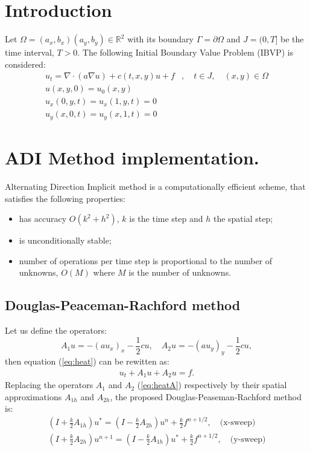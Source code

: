 \documentclass[12pt]{article}
\begin{document}
\section{Introduction}
Let $\Omega=(a_x, b_x)(a_y, b_y)\in \mathbb{R}^2$ with its boundary $\Gamma=\partial \Omega$ and
$J=(0,T]$ be the time interval, $T>0$. The following Initial Boundary Value Problem (IBVP) is considered:
\begin{eqnarray}
u_t= \nabla\cdot(a\nabla u) + c(t, x, y) u + f&, \quad t\in J, \quad (x,y)\in \Omega \label{eq:heat}\\
u(x,y,0) = u_0(x,y)&\\
u_x(0,y,t)=u_x(1,y,t)=0&\\
u_y(x,0,t)=u_y(x,1,t)=0& 
\end{eqnarray}




\section{ADI Method implementation.}
 Alternating Direction Implicit method is a computationally efficient scheme,
 that satisfies the following properties:
  \begin{itemize}
    \item has accuracy $O(k^2 + h^2)$, $k$ is the time step and $h$ the spatial
    step;
    \item is unconditionally stable;
    \item number of operations per time step is proportional to the number of unknowns, $O(M)$
     where $ M$ is the number of unknowns.       
  \end{itemize}

\subsection{Douglas-Peaceman-Rachford method}
Let us define the operators:
$$A_1u = -(au_x)_x - \frac{1}{2}cu, \quad A_2u = -(au_y)_y - \frac{1}{2}cu,$$
then equation (\ref{eq:heat}) can be rewitten as:
\begin{eqnarray} 
u_t + A_1u + A_2u = f. \label{eq:heatA}
\end{eqnarray}
Replacing the operators $A_1$ and $A_2$ (\ref{eq:heatA}) respectively by their spatial approximations
$A_{1h}$ and $A_{2h}$, the proposed Douglas-Peaseman-Rachford method is:
\begin{eqnarray}
(I+\frac{k}{2}A_{1h})u^* = (I-\frac{k}{2}A_{2h})u^n + \frac{k}{2}f^{n+1/2}, \quad \text{(x-sweep)} 
\label{equ:x-sweep}\\
(I+\frac{k}{2}A_{2h})u^{n+1} = (I-\frac{k}{2}A_{1h})u^* + \frac{k}{2}f^{n+1/2}, \quad \text{(y-sweep)}
\end{eqnarray} \label{equ:y-sweep}
\end{document}
